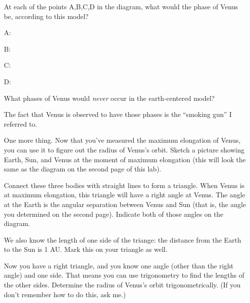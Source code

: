 At each of the points A,B,C,D in the diagram, what would the phase
of Venus be, according to this model?

A:

B:

C: 

D:

What phases of Venus would {\it never} occur in the earth-centered
model?

\answerspace{ 0.7in}

The fact that Venus is observed to have those phases is the ``smoking
gun'' I referred to.

\pagebreak[4]
One more thing.  Now that you've measured the maximum elongation of
Venus, you can use it to figure out the radius of Venus's orbit.
Sketch a picture showing Earth, Sun, and Venus at the moment of 
maximum elongation (this will look the same as the diagram on the
second page of this lab).  

\answerspace{ 2in}

Connect these three bodies with straight lines to form a triangle.
When Venus is at maximum elongation, this triangle will have a right
angle at Venus.  The angle at the Earth is the angular separation
between Venus and Sun (that is, the angle you determined on the second page).
Indicate both of those angles on the diagram.

We also know the length of one side of the triange: the distance from
the Earth to the Sun is 1 AU.  Mark this on your triangle as well.

Now you have a right triangle, and you know one angle (other
than the right angle) and one side.
That means you can use trigonometry to find the lengths of the
other sides.  Determine the radius of Venus's orbit trigonometrically.
(If you don't remember how to do this, ask me.)



